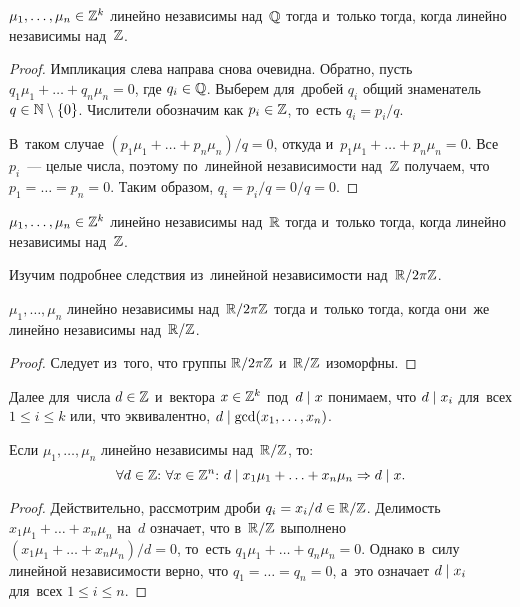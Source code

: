 \documentclass[a4paper,oneside]{article}
\begin{document}
\begin{lemma*}
    $\mu_1, \ldots, \mu_n \in \mathbb{Z}^k$ линейно независимы над~$\mathbb{Q}$ тогда и~только тогда, когда линейно независимы над~$\mathbb{Z}$.
\end{lemma*}

\begin{proof}
    Импликация слева направа снова очевидна. Обратно, пусть $q_1 \mu_1 + \ldots + q_n \mu_n = 0$, где $q_i \in \mathbb{Q}$.
    Выберем для~дробей $q_i$ общий знаменатель $q \in \mathbb{N} \setminus \{ 0 \}$. Числители обозначим как $p_i \in \mathbb{Z}$, то~есть $q_i = p_i / q$.

    В~таком случае $(p_1 \mu_1 + \ldots + p_n \mu_n) / q = 0$, откуда и~$p_1 \mu_1 + \ldots + p_n \mu_n = 0$.
    Все $p_i$~— целые числа, поэтому по~линейной независимости над~$\mathbb{Z}$ получаем, что $p_1 = \ldots = p_n = 0$.
    Таким образом, $q_i = p_i / q = 0 / q = 0$.
\end{proof}

\begin{consequence*}
    $\mu_1, \ldots, \mu_n \in \mathbb{Z}^k$ линейно независимы над~$\mathbb{R}$ тогда и~только тогда, когда линейно независимы над~$\mathbb{Z}$.
\end{consequence*}

Изучим подробнее следствия из~линейной независимости над~$\mathbb{R} / 2 \pi \mathbb{Z}$.

\begin{statement*}
    $\mu_1, \ldots, \mu_n$ линейно независимы над~$\mathbb{R} / 2 \pi \mathbb{Z}$
    тогда и~только тогда, когда они~же линейно независимы над~$\mathbb{R} / \mathbb{Z}$.
\end{statement*}

\begin{proof}
    Следует из~того, что группы $\mathbb{R} / 2 \pi \mathbb{Z}$ и~$\mathbb{R} / \mathbb{Z}$ изоморфны.
\end{proof}

Далее для~числа $d \in \mathbb{Z}$ и~вектора $x \in \mathbb{Z}^k$ под~$d \mid x$ понимаем, что $d \mid x_i$ для~всех $1 \leq i \leq k$
или, что эквивалентно, $d \mid \gcd(x_1, \ldots, x_n)$.

\begin{lemma*}
    Если $\mu_1, \ldots, \mu_n$ линейно независимы над~$\mathbb{R} / \mathbb{Z}$, то:
    $$
        \forall d \in \Z{:}\ \forall x \in \Z^n{:}\ d \divides x_1 \mu_1 + \ldots + x_n \mu_n \Rightarrow d \divides x.
    $$
\end{lemma*}

\begin{proof}
    Действительно, рассмотрим дроби $q_i = x_i / d \in \mathbb{R} / \mathbb{Z}$. Делимость $x_1 \mu_1 + \ldots + x_n \mu_n$ на~$d$ означает,
    что в~$\mathbb{R} / \mathbb{Z}$ выполнено $(x_1 \mu_1 + \ldots + x_n \mu_n) / d = 0$, то~есть $q_1 \mu_1 + \ldots + q_n \mu_n = 0$.
    Однако в~силу линейной независимости верно, что $q_1 = \ldots = q_n = 0$, а~это означает $d \mid x_i$ для~всех $1 \leq i \leq n$.
\end{proof}
\end{document}
